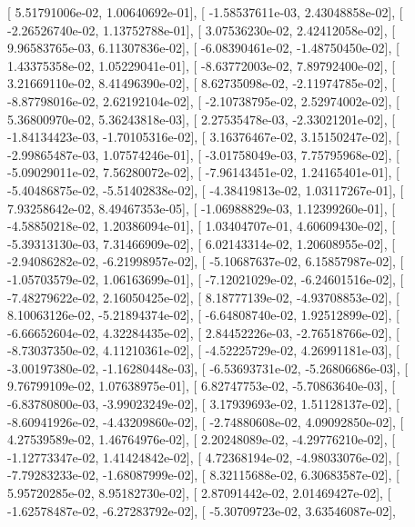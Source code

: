 \documentclass{article}
\begin{document}
       [  5.51791006e-02,   1.00640692e-01],
       [ -1.58537611e-03,   2.43048858e-02],
       [ -2.26526740e-02,   1.13752788e-01],
       [  3.07536230e-02,   2.42412058e-02],
       [  9.96583765e-03,   6.11307836e-02],
       [ -6.08390461e-02,  -1.48750450e-02],
       [  1.43375358e-02,   1.05229041e-01],
       [ -8.63772003e-02,   7.89792400e-02],
       [  3.21669110e-02,   8.41496390e-02],
       [  8.62735098e-02,  -2.11974785e-02],
       [ -8.87798016e-02,   2.62192104e-02],
       [ -2.10738795e-02,   2.52974002e-02],
       [  5.36800970e-02,   5.36243818e-03],
       [  2.27535478e-03,  -2.33021201e-02],
       [ -1.84134423e-03,  -1.70105316e-02],
       [  3.16376467e-02,   3.15150247e-02],
       [ -2.99865487e-03,   1.07574246e-01],
       [ -3.01758049e-03,   7.75795968e-02],
       [ -5.09029011e-02,   7.56280072e-02],
       [ -7.96143451e-02,   1.24165401e-01],
       [ -5.40486875e-02,  -5.51402838e-02],
       [ -4.38419813e-02,   1.03117267e-01],
       [  7.93258642e-02,   8.49467353e-05],
       [ -1.06988829e-03,   1.12399260e-01],
       [ -4.58850218e-02,   1.20386094e-01],
       [  1.03404707e-01,   4.60609430e-02],
       [ -5.39313130e-03,   7.31466909e-02],
       [  6.02143314e-02,   1.20608955e-02],
       [ -2.94086282e-02,  -6.21998957e-02],
       [ -5.10687637e-02,   6.15857987e-02],
       [ -1.05703579e-02,   1.06163699e-01],
       [ -7.12021029e-02,  -6.24601516e-02],
       [ -7.48279622e-02,   2.16050425e-02],
       [  8.18777139e-02,  -4.93708853e-02],
       [  8.10063126e-02,  -5.21894374e-02],
       [ -6.64808740e-02,   1.92512899e-02],
       [ -6.66652604e-02,   4.32284435e-02],
       [  2.84452226e-03,  -2.76518766e-02],
       [ -8.73037350e-02,   4.11210361e-02],
       [ -4.52225729e-02,   4.26991181e-03],
       [ -3.00197380e-02,  -1.16280448e-03],
       [ -6.53693731e-02,  -5.26806686e-03],
       [  9.76799109e-02,   1.07638975e-01],
       [  6.82747753e-02,  -5.70863640e-03],
       [ -6.83780800e-03,  -3.99023249e-02],
       [  3.17939693e-02,   1.51128137e-02],
       [ -8.60941926e-02,  -4.43209860e-02],
       [ -2.74880608e-02,   4.09092850e-02],
       [  4.27539589e-02,   1.46764976e-02],
       [  2.20248089e-02,  -4.29776210e-02],
       [ -1.12773347e-02,   1.41424842e-02],
       [  4.72368194e-02,  -4.98033076e-02],
       [ -7.79283233e-02,  -1.68087999e-02],
       [  8.32115688e-02,   6.30683587e-02],
       [  5.95720285e-02,   8.95182730e-02],
       [  2.87091442e-02,   2.01469427e-02],
       [ -1.62578487e-02,  -6.27283792e-02],
       [ -5.30709723e-02,   3.63546087e-02],
\end{document}
